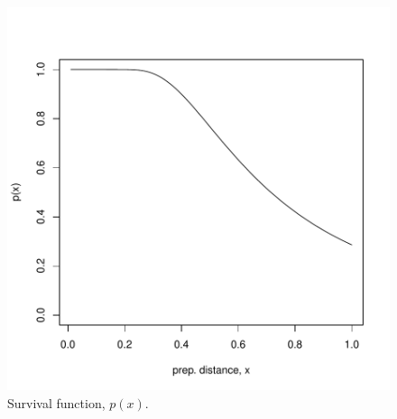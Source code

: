 \documentclass{article}
\begin{document}
\begin{figure}
\begin{centering}
\includegraphics{simulations-figsur}
\caption{Survival function, $p(x)$.} \label{fig:sur}
\end{centering}
\end{figure}
\end{document}
